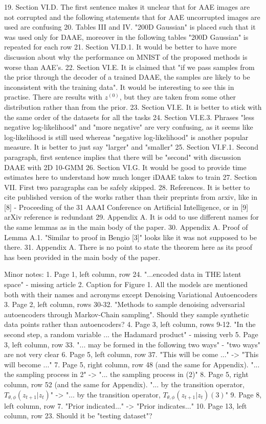 \documentclass{article}
\begin{document}
19. Section VI.D. The first sentence makes it unclear that for AAE images are not corrupted and the following statements that for AAE uncorrupted images are used are confusing
20. Tables III and IV. "200D Gaussian" is placed such that it was used only for DAAE, moreover in the following tables "200D Gaussian" is repeated for each row
21. Section VI.D.1. It would be better to have more discussion about why the performance on MNIST of the proposed methods is worse than AAE's.
22. Section VI.E. It is claimed that "if we pass samples from the prior through the decoder of a trained DAAE, the samples are likely to be inconsistent with the training data". It would be interesting to see this in practise. There are results with $z^{(0)}$, but they are taken from some other distribution rather than from the prior.
23. Section VI.E. It is better to stick with the same order of the datasets for all the tasks
24. Section VI.E.3. Phrases "less negative log-likelihood" and "more negative" are very confusing, as it seems like log-likelihood is still used whereas "negative log-likelihood" is another popular measure. It is better to just say "larger" and "smaller"
25. Section VI.F.1. Second paragraph, first sentence implies that there will be "second" with discussion DAAE with 2D 10-GMM
26. Section VI.G. It would be good to provide time estimates here to understand how much longer iDAAE takes to train
27. Section VII. First two paragraphs can be safely skipped.
28. References. It is better to cite published version of the works rather than their preprints from arxiv, like in [8] - Proceeding of the 31 AAAI Conference on Artificial Intelligence, or in [9] arXiv reference is redundant
29. Appendix A. It is odd to use different names for the same lemmas as in the main body of the paper.
30. Appendix A. Proof of Lemma A.1. "Similar to proof in Bengio [3]" looks like it was not supposed to be there.
31. Appendix A. There is no point to state the theorem here as its proof has been provided in the main body of the paper. 

Minor notes:
1. Page 1, left column, row 24. "...encoded data in THE latent space" - missing article
2. Caption for Figure 1. All the models are mentioned both with their names and acronyms except Denoising Variational Autoencoders
3. Page 2, left column, rows 30-32. "Methods to sample denoising adversarial autoencoders through Markov-Chain sampling". Should they sample synthetic data points rather than autoencoders?
4. Page 3, left column, rows 9-12. "In the second step, a random variable ... the Hadamard product" - missing verb
5. Page 3, left column, row 33. "... may be formed in the following two ways" - "two ways" are not very clear
6. Page 5, left column, row 37. "This will be come ..." -> "This will become ..."
7. Page 5, right column, row 48 (and the same for Appendix). "... the sampling process in 2" -> "... the sampling process in (2)"
8. Page 5, right column, row 52 (and the same for Appendix). "... by the transition operator, $T_{\theta, \phi}(z_{t+1}|z_t)$" -> "... by the transition operator, $T_{\theta, \phi}(z_{t+1}|z_t) (3)$"
9. Page 8, left column, row 7. "Prior indicated..." -> "Prior indicates..."
10. Page 13, left column, row 23. Should it be "testing dataset"?
\end{document}
